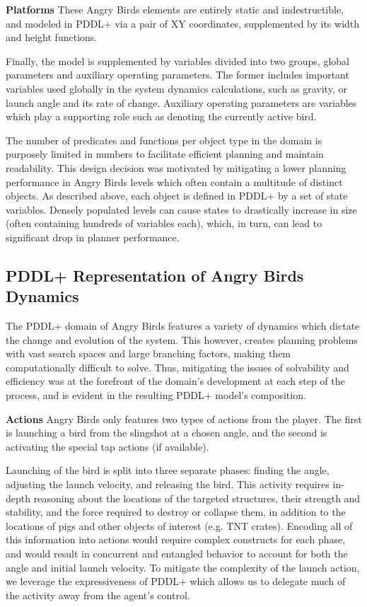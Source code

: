 \noindent\textbf{Platforms} These Angry Birds elements are entirely static and indestructible, and modeled in PDDL+ via a pair of XY coordinates, supplemented by its width and height functions.

\smallskip
Finally, the model is supplemented by variables divided into two groups, global parameters and auxiliary operating parameters. The former includes important variables used globally in the system dynamics calculations, such as gravity, or launch angle and its rate of change. Auxiliary operating parameters are variables which play a supporting role such as denoting the currently active bird.

The number of predicates and functions per object type in the domain is purposely limited in numbers to facilitate efficient planning and maintain readability. This design decision was motivated by mitigating a lower planning performance in Angry Birds levels which often contain a multitude of distinct objects. As described above, each object is defined in PDDL+ by a set of state variables. Densely populated levels can cause states to drastically increase in size (often containing hundreds of variables each), which, in turn, can lead to significant drop in planner performance.

\subsection{PDDL+ Representation of Angry Birds Dynamics} 

The PDDL+ domain of Angry Birds features a variety of dynamics which dictate the change and evolution of the system. This however, creates planning problems with vast search spaces and large branching factors, making them computationally difficult to solve. Thus, mitigating the issues of solvability and efficiency was at the forefront of the domain's development at each step of the process, and is evident in the resulting PDDL+ model's composition.

\noindent\textbf{Actions} Angry Birds only features two types of actions from the player. %
The first is launching a bird from the slingshot at a chosen angle, and the second is activating the special tap actions (if available). 

Launching of the bird is split into three separate phases: finding the angle, adjusting the launch velocity, and releasing the bird. This activity requires in-depth reasoning about the locations of the targeted structures, their strength and stability, and the force required to destroy or collapse them, in addition to the locations of pigs and other objects of interest (e.g. TNT crates). Encoding all of this information into actions would require complex constructs for each phase, and would result in concurrent and entangled behavior to account for both the angle and initial launch velocity. To mitigate the complexity of the launch action, we leverage the expressiveness of PDDL+ which allows us to delegate much of the activity away from the agent's control. 

